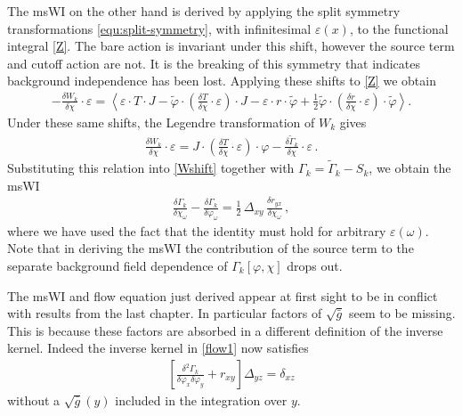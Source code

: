 \documentclass[11pt]{book}
\numberwithin{equation}{chapter}
\begin{document}
The msWI on the other hand is derived by applying the
split symmetry transformations \eqref{equ:split-symmetry},
with infinitesimal $\varepsilon(x)$, to the functional integral \eqref{Z}.
The bare action is invariant under this shift, however the source term and cutoff action are not.
It is the breaking of this symmetry that indicates background independence has been lost.
Applying these shifts to \eqref{Z} we obtain
\begin{align}
	-\frac{\delta W_k}{\delta\chi}\cdot\varepsilon=\left< \varepsilon\cdot T\cdot J-
	\tilde\varphi\cdot\left(\frac{\delta T}{\delta\chi}\cdot\varepsilon\right)\cdot J
	- \varepsilon\cdot r\cdot\tilde\varphi
	+\frac{1}{2}\tilde\varphi\cdot\left(\frac{\delta r}{\delta\chi}\cdot\varepsilon\right)\cdot\tilde\varphi\right>.
	\label{Wshift}
\end{align}
Under these same shifts, the Legendre transformation of $W_k$ gives
\begin{align}
	\frac{\delta W_k}{\delta\chi}\cdot\varepsilon
	= J\cdot\left(\frac{\delta T}{\delta\chi}\cdot\varepsilon\right)\cdot\varphi
	- \frac{\delta\tilde\Gamma_k}{\delta\chi}\cdot\varepsilon \,.
\end{align}
Substituting this relation into \eqref{Wshift} together with
$\Gamma_k=\tilde\Gamma_k-S_k$,
we obtain the msWI
\begin{align}
	\frac{\delta \Gamma_k}{\delta\chi_\omega}-\frac{\delta \Gamma_k}{\delta\varphi_\omega}=
	\frac{1}{2} \, \Delta_{xy}\,\frac{\delta r_{yx}}{\delta\chi_\omega} \,,
	\label{msWIuntrunc}
\end{align}
where we have used the fact that the identity must hold for arbitrary $\varepsilon(\omega)$.
Note that in deriving the msWI the contribution of the source term to the separate background
field dependence of $\Gamma_k[\varphi,\chi]$ drops out.

The msWI and flow equation just derived
appear at first sight to be in conflict with results from the last chapter.
In particular factors of $\sqrt{\bar g}$ seem to be missing.
This is because these factors are absorbed in a different definition of the inverse kernel.
Indeed the inverse kernel in \eqref{flow1} now satisfies
\begin{align}
  \left[
    \frac{\delta^{2}\Gamma_k}{\delta\varphi_x \delta\varphi_y}+r_{xy}
  \right] \Delta_{yz} =\delta_{xz}
\end{align}
without a $\sqrt{\bar g}(y)$ included in the integration over $y$.
\end{document}
